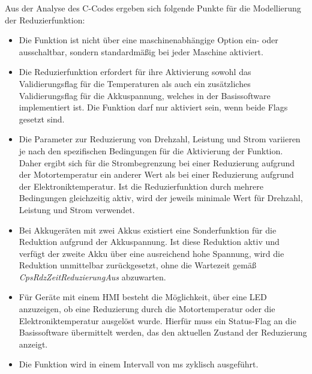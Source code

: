 Aus der Analyse des C-Codes \cite{Firmware_gesamt} ergeben sich folgende Punkte für die Modellierung der Reduzierfunktion:
\begin{itemize}
\item Die Funktion ist nicht über eine maschinenabhängige Option ein- oder ausschaltbar, sondern standardmäßig bei jeder Maschine aktiviert.
\item Die Reduzierfunktion erfordert für ihre Aktivierung sowohl das Validierungsflag für die Temperaturen als auch ein zusätzliches Validierungsflag für die Akkuspannung, welches in der Basissoftware implementiert ist. Die Funktion darf nur aktiviert sein, wenn beide Flags gesetzt sind.
\item Die Parameter zur Reduzierung von Drehzahl, Leistung und Strom variieren je nach den spezifischen Bedingungen für die Aktivierung der Funktion. Daher ergibt sich für die Strombegrenzung bei einer Reduzierung aufgrund der Motortemperatur ein anderer Wert als bei einer Reduzierung aufgrund der Elektroniktemperatur. Ist die Reduzierfunktion durch mehrere Bedingungen gleichzeitig aktiv, wird der jeweils minimale Wert für Drehzahl, Leistung und Strom verwendet.
\item Bei Akkugeräten mit zwei Akkus existiert eine Sonderfunktion für die Reduktion aufgrund der Akkuspannung. Ist diese Reduktion aktiv und verfügt der zweite Akku über eine ausreichend hohe Spannung, wird die Reduktion unmittelbar zurückgesetzt, ohne die Wartezeit gemäß \textit{CpsRdzZeitReduzierungAus} abzuwarten.
\item Für Geräte mit einem HMI besteht die Möglichkeit, über eine LED anzuzeigen, ob eine Reduzierung durch die Motortemperatur oder die Elektroniktemperatur ausgelöst wurde. Hierfür muss ein Status-Flag an die Basissoftware übermittelt werden, das den aktuellen Zustand der Reduzierung anzeigt.
\item Die Funktion wird in einem Intervall von \unit[1]{ms} zyklisch ausgeführt.
\end{itemize}
